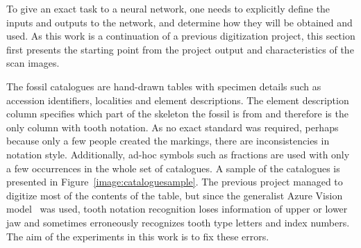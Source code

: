 \documentclass[english,twoside,openright]{UH_DS_MSc}
\begin{document}
To give an exact task to a neural network, one needs to explicitly define 
the inputs and outputs to the network, and determine how they will be obtained and used.
 As this work is a continuation of 
a previous digitization project, this section first presents the starting point 
from the project output and characteristics of the scan images. 

The fossil catalogues are hand-drawn tables with specimen details such 
as accession identifiers, localities and element descriptions. The element description 
column specifies which part of the skeleton the fossil is from and therefore is the only 
column with tooth notation.
As no exact standard was required, perhaps because only a few people 
created the markings, there are inconsistencies in notation style. Additionally,
ad-hoc symbols such as fractions are used with only a few occurrences in the whole set of catalogues. 
A sample of the catalogues is presented in Figure~\ref{image:cataloguesample}.
The previous project managed to digitize most of the contents of the table, but since 
the generalist Azure Vision model~\cite{azurevision} was used, tooth notation recognition
loses information of upper or lower jaw and sometimes
erroneously recognizes tooth type letters and index numbers.
The aim of the experiments in this work is to fix these errors.
\end{document}
